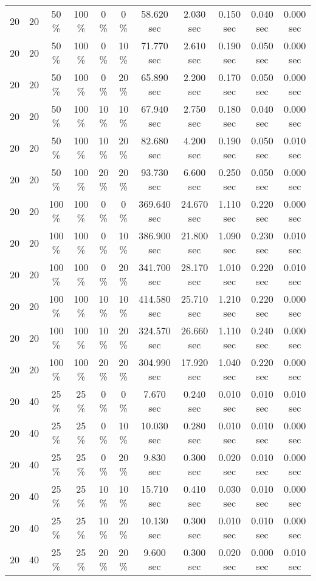 \documentclass{article}
\begin{document}
\begin{longtable}[]{@{}ccccccccccc@{}}
20 & 20 & 50 \% & 100 \% & 0 \% & 0 \% & 58.620 sec & 2.030 sec & 0.150 sec & 0.040 sec & 0.000 sec \\
20 & 20 & 50 \% & 100 \% & 0 \% & 10 \% & 71.770 sec & 2.610 sec & 0.190 sec & 0.050 sec & 0.000 sec \\
20 & 20 & 50 \% & 100 \% & 0 \% & 20 \% & 65.890 sec & 2.200 sec & 0.170 sec & 0.050 sec & 0.000 sec \\
20 & 20 & 50 \% & 100 \% & 10 \% & 10 \% & 67.940 sec & 2.750 sec & 0.180 sec & 0.040 sec & 0.000 sec \\
20 & 20 & 50 \% & 100 \% & 10 \% & 20 \% & 82.680 sec & 4.200 sec & 0.190 sec & 0.050 sec & 0.010 sec \\
20 & 20 & 50 \% & 100 \% & 20 \% & 20 \% & 93.730 sec & 6.600 sec & 0.250 sec & 0.050 sec & 0.000 sec \\
20 & 20 & 100 \% & 100 \% & 0 \% & 0 \% & 369.640 sec & 24.670 sec & 1.110 sec & 0.220 sec & 0.000 sec \\
20 & 20 & 100 \% & 100 \% & 0 \% & 10 \% & 386.900 sec & 21.800 sec & 1.090 sec & 0.230 sec & 0.010 sec \\
20 & 20 & 100 \% & 100 \% & 0 \% & 20 \% & 341.700 sec & 28.170 sec & 1.010 sec & 0.220 sec & 0.010 sec \\
20 & 20 & 100 \% & 100 \% & 10 \% & 10 \% & 414.580 sec & 25.710 sec & 1.210 sec & 0.220 sec & 0.000 sec \\
20 & 20 & 100 \% & 100 \% & 10 \% & 20 \% & 324.570 sec & 26.660 sec & 1.110 sec & 0.240 sec & 0.000 sec \\
20 & 20 & 100 \% & 100 \% & 20 \% & 20 \% & 304.990 sec & 17.920 sec & 1.040 sec & 0.220 sec & 0.000 sec \\
20 & 40 & 25 \% & 25 \% & 0 \% & 0 \% & 7.670 sec & 0.240 sec & 0.010 sec & 0.010 sec & 0.010 sec \\
20 & 40 & 25 \% & 25 \% & 0 \% & 10 \% & 10.030 sec & 0.280 sec & 0.010 sec & 0.010 sec & 0.000 sec \\
20 & 40 & 25 \% & 25 \% & 0 \% & 20 \% & 9.830 sec & 0.300 sec & 0.020 sec & 0.010 sec & 0.000 sec \\
20 & 40 & 25 \% & 25 \% & 10 \% & 10 \% & 15.710 sec & 0.410 sec & 0.030 sec & 0.010 sec & 0.000 sec \\
20 & 40 & 25 \% & 25 \% & 10 \% & 20 \% & 10.130 sec & 0.300 sec & 0.010 sec & 0.010 sec & 0.000 sec \\
20 & 40 & 25 \% & 25 \% & 20 \% & 20 \% & 9.600 sec & 0.300 sec & 0.020 sec & 0.000 sec & 0.010 sec \\

\end{longtable}
\end{document}
